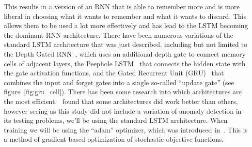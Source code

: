 This results in a version of an RNN that is able to remember more and is more liberal in choosing what it wants to remember and what it wants to discard. This allows them to be used a lot more effectively and has lead to the LSTM becoming the dominant RNN architecture. There have been numerous variations of the standard LSTM architecture that was just described, including but not limited to the Depth Gated RNN~\cite{yao2015depth}, which uses an additional depth gate to connect memory cells of adjacent layers, the Peephole LSTM~\cite{gers2002learning} that connects the hidden state with the gate activation functions, and the Gated Recurrent Unit (GRU)~\cite{cho2014learning} that combines the input and forget gates into a single so-called \enquote{update gate} (see figure~\ref{fig:gru_cell}). There has been some research into which architectures are the most efficient.~\cite{jozefowicz2015empirical} found that some architectures did work better than others, however seeing as this study did not include a variation of anomaly detection in its testing problems, we'll be using the standard LSTM architecture. When training we will be using the \enquote{adam} optimizer, which was introduced in~\cite{kingma2014adam}. This is a method of gradient-based optimization of stochastic objective functions.